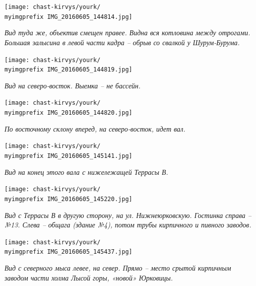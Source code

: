 \begin{center}
\texttt{[image: chast-kirvys/yourk/\\myimgprefix IMG\_20160605\_144814.jpg]}

\textit{Вид туда же, объектив смещен правее. Видна вся котловина между отрогами. Большая залысина в левой части кадра – обрыв со свалкой у Шурум-Бурума.}
\end{center}

\newpage

\begin{center}
\texttt{[image: chast-kirvys/yourk/\\myimgprefix IMG\_20160605\_144819.jpg]}

\textit{Вид на северо-восток. Выемка – не бассейн.}
\end{center}

\begin{center}
\texttt{[image: chast-kirvys/yourk/\\myimgprefix IMG\_20160605\_144820.jpg]}

\textit{По восточному склону вперед, на северо-восток, идет вал.}
\end{center}

\newpage

\begin{center}
\texttt{[image: chast-kirvys/yourk/\\myimgprefix IMG\_20160605\_145141.jpg]}

\textit{Вид на конец этого вала с нижележащей Террасы В.}
\end{center}


\begin{center}
\texttt{[image: chast-kirvys/yourk/\\myimgprefix IMG\_20160605\_145220.jpg]}

\textit{Вид с Террасы В в другую сторону, на ул. Нижнеюрковскую. Гостинка справа – №13. Слева – общага (здание №4), потом трубы кирпичного и пивного заводов.}
\end{center}

\newpage

\begin{center}
\texttt{[image: chast-kirvys/yourk/\\myimgprefix IMG\_20160605\_145437.jpg]}

\textit{Вид с северного мыса левее, на север. Прямо – место срытой кирпичным заводом части холма Лысой горы, «новой» Юрковицы.}
\end{center}


